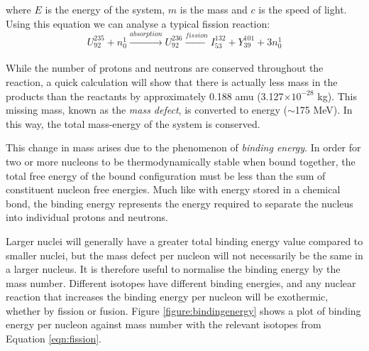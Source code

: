 where $E$ is the energy of the system, $m$ is the mass and $c$ is the speed of light. Using this equation we can analyse a typical fission reaction:
\begin{equation}
    U^{235}_{92} + n^{1}_{0} \xrightarrow[]{absorption} U^{236}_{92} \xrightarrow[]{fission} I^{132}_{53} + Y^{101}_{39} + 3n^{1}_{0}
\label{eqn:fission} 
\end{equation}

While the number of protons and neutrons are conserved throughout the reaction, a quick calculation will show that there is actually less mass in the products than the reactants by approximately 0.188 amu (3.127$\times 10^{-28}$ kg). This missing mass, known as the \emph{mass defect}, is converted to energy ($\sim$175 MeV). In this way, the total mass-energy of the system is conserved. 

This change in mass arises due to the phenomenon of \emph{binding energy}. In order for two or more nucleons to be thermodynamically stable when bound together, the total free energy of the bound configuration must be less than the sum of constituent nucleon free energies. Much like with energy stored in a chemical bond, the binding energy represents the energy required to separate the nucleus into individual protons and neutrons. 

Larger nuclei will generally have a greater total binding energy value compared to smaller nuclei, but the mass defect per nucleon will not necessarily be the same in a larger nucleus. It is therefore useful to normalise the binding energy by the mass number. Different isotopes have different binding energies, and any nuclear reaction that increases the binding energy per nucleon will be exothermic, whether by fission or fusion. Figure \ref{figure:bindingenergy} shows a plot of binding energy per nucleon against mass number with the relevant isotopes from Equation \ref{eqn:fission}. 





